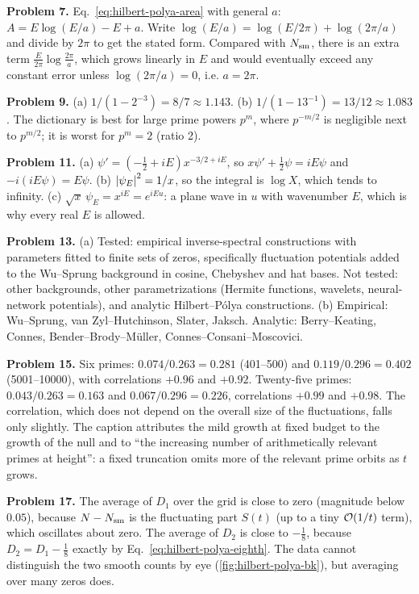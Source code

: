 \textbf{Problem 7.} Eq.~\eqref{eq:hilbert-polya-area} with general $a$: $A=E\log(E/a)-E+a$. Write $\log(E/a)=\log(E/2\pi)+\log(2\pi/a)$ and divide by $2\pi$ to get the stated form. Compared with $N_{\mathrm{sm}}$, there is an extra term $\frac{E}{2\pi}\log\frac{2\pi}{a}$, which grows linearly in $E$ and would eventually exceed any constant error unless $\log(2\pi/a)=0$, i.e. $a=2\pi$.

\textbf{Problem 9.} (a) $1/(1-2^{-3})=8/7\approx1.143$. (b) $1/(1-13^{-1})=13/12\approx1.083$. The dictionary is best for large prime powers $p^m$, where $p^{-m/2}$ is negligible next to $p^{m/2}$; it is worst for $p^m=2$ (ratio 2).

\textbf{Problem 11.} (a) $\psi'=(-\tfrac12+iE)x^{-3/2+iE}$, so $x\psi'+\tfrac12\psi=iE\psi$ and $-i(iE\psi)=E\psi$. (b) $\left\lvert \psi_E\right\rvert^2=1/x$, so the integral is $\log X$, which tends to infinity. (c) $\sqrt x\,\psi_E=x^{iE}=e^{iEu}$: a plane wave in $u$ with wavenumber $E$, which is why every real $E$ is allowed.

\textbf{Problem 13.} (a) Tested: empirical inverse-spectral constructions with parameters fitted to finite sets of zeros, specifically fluctuation potentials added to the Wu--Sprung background in cosine, Chebyshev and hat bases. Not tested: other backgrounds, other parametrizations (Hermite functions, wavelets, neural-network potentials), and analytic Hilbert--P\'olya constructions. (b) Empirical: Wu--Sprung, van Zyl--Hutchinson, Slater, Jaksch. Analytic: Berry--Keating, Connes, Bender--Brody--M\"uller, Connes--Consani--Moscovici.

\textbf{Problem 15.} Six primes: $0.074/0.263=0.281$ (401--500) and $0.119/0.296=0.402$ (5001--10000), with correlations $+0.96$ and $+0.92$. Twenty-five primes: $0.043/0.263=0.163$ and $0.067/0.296=0.226$, correlations $+0.99$ and $+0.98$. The correlation, which does not depend on the overall size of the fluctuations, falls only slightly. The caption attributes the mild growth at fixed budget to the growth of the null and to ``the increasing number of arithmetically relevant primes at height'': a fixed truncation omits more of the relevant prime orbits as $t$ grows.

\textbf{Problem 17.} The average of $D_1$ over the grid is close to zero (magnitude below $0.05$), because $N-N_{\mathrm{sm}}$ is the fluctuating part $S(t)$ (up to a tiny $\mathcal{O}(1/t)$ term), which oscillates about zero. The average of $D_2$ is close to $-\tfrac18$, because $D_2=D_1-\tfrac18$ exactly by Eq.~\eqref{eq:hilbert-polya-eighth}. The data cannot distinguish the two smooth counts by eye (\cref{fig:hilbert-polya-bk}), but averaging over many zeros does.

